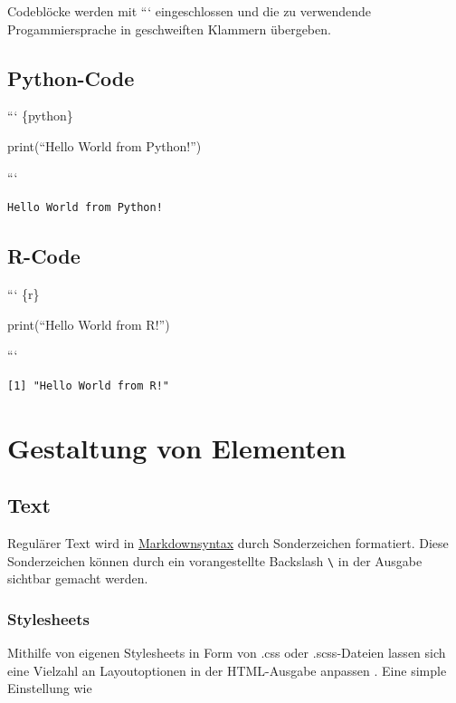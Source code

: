 \documentclass[
  letterpaper,
  DIV=11]{scrartcl}
\begin{document}
Codeblöcke werden mit ``` eingeschlossen und die zu verwendende
Progammiersprache in geschweiften Klammern übergeben.

\subsection{Python-Code}

``` \{python\}

print(``Hello World from Python!'')

```

\begin{verbatim}
Hello World from Python!
\end{verbatim}

\subsection{R-Code}

``` \{r\}

print(``Hello World from R!'')

```

\begin{verbatim}
[1] "Hello World from R!"
\end{verbatim}

\section{Gestaltung von Elementen}\label{sec-Elemente}

\subsection{Text}\label{text}

Regulärer Text wird in
\href{https://quarto.org/docs/authoring/markdown-basics.html\#overview}{Markdownsyntax}
durch Sonderzeichen formatiert. Diese Sonderzeichen können durch ein
vorangestellte Backslash \texttt{\textbackslash{}} in der Ausgabe
sichtbar gemacht werden.

\subsubsection{Stylesheets}\label{stylesheets}

Mithilfe von eigenen Stylesheets in Form von .css oder .scss-Dateien
lassen sich eine Vielzahl an Layoutoptionen in der HTML-Ausgabe anpassen
\autocite{W3Schools-Stylesheets}. Eine simple Einstellung wie
\end{document}
